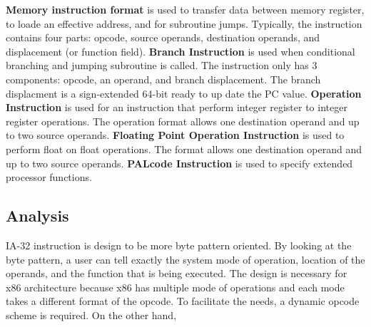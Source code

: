\documentclass[letterpaper,10pt,titlepage]{article}
\begin{document}

\textbf{Memory instruction format} is used to transfer data between memory register,
to loade an effective address, and for subroutine jumps. Typically, the instruction 
contains four parts: opcode, source operands, destination operands, and displacement
(or function field). \textbf{Branch Instruction} is used when conditional branching 
and jumping subroutine is called. The instruction only has 3 components: opcode, 
an operand, and branch displacement. The branch displacment is a sign-extended 64-bit
ready to up date the PC value. \textbf{Operation Instruction} is used for an instruction
that perform integer register to integer register operations. The operation format allows
one destination operand and up to two source operands. \textbf{Floating Point Operation
Instruction} is used to perform float on float operations. The format allows one 
destination operand and up to two source operands. \textbf{PALcode Instruction} is used
to specify extended processor functions. 


\subsection{Analysis}
IA-32 instruction is design to be more byte pattern oriented. 
By looking at the byte pattern, a user can tell exactly the system mode of operation,
location of the operands, and the function that is being executed. 
The design is necessary for x86 architecture because x86 has multiple mode of operations
and each mode takes a different format of the opcode. To facilitate the needs, a dynamic
opcode scheme is required. On the other hand,  





\newpage
\nocite{*}


\end{document}
